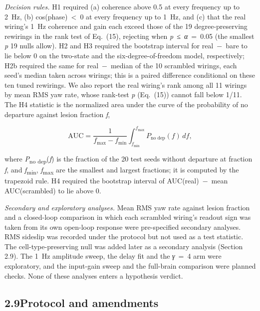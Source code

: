 \documentclass[11pt,letterpaper]{article}
\begin{document}
\emph{Decision rules.} H1 required (a) coherence above 0.5 at every
frequency up to 2~Hz, (b) cos(phase)~\textless~0 at every frequency up
to 1~Hz, and (c) that the real wiring's 1~Hz coherence and gain each
exceed those of the 19 degree-preserving rewirings in the rank test of
Eq.~(15), rejecting when \emph{p}~≤~\emph{α}~=~0.05 (the smallest
\emph{p} 19 nulls allow). H2 and H3 required the bootstrap interval for
real~−~bare to lie below 0 on the two-state and the
six-degree-of-freedom model, respectively; H2b required the same for
real~−~median of the 10 scrambled wirings, each seed's median taken
across wirings; this is a paired difference conditional on these ten
tuned rewirings. We also report the real wiring's rank among all 11
wirings by mean RMS yaw rate, whose rank-test \emph{p} (Eq.~(15)) cannot
fall below 1/11. The H4 statistic is the normalized area under the curve
of the probability of no departure against lesion fraction \emph{f},

\[\mathrm{AUC}=\frac{1}{f_{\max}-f_{\min}}\int_{f_{\min}}^{f_{\max}}P_{\text{no dep}}(f)\,df,\tag{16}\]

\noindent where \emph{P}\textsubscript{no dep}(\emph{f}) is the fraction
of the 20 test seeds without departure at fraction \emph{f}, and
\emph{f}\textsubscript{min}, \emph{f}\textsubscript{max} are the
smallest and largest fractions; it is computed by the trapezoid rule. H4
required the bootstrap interval of AUC(real)~−~mean AUC(scrambled) to
lie above 0.

\emph{Secondary and exploratory analyses.} Mean RMS yaw rate against
lesion fraction and a closed-loop comparison in which each scrambled
wiring's readout sign was taken from its own open-loop response were
pre-specified secondary analyses. RMS sideslip was recorded under the
protocol but not used as a test statistic. The cell-type-preserving null
was added later as a secondary analysis (Section 2.9). The 1~Hz
amplitude sweep, the delay fit and the \emph{γ}~=~4 arm were
exploratory, and the input-gain sweep and the full-brain comparison were
planned checks. None of these analyses enters a hypothesis verdict.

\subsection{\texorpdfstring{2.9\quad Protocol and
amendments}{2.9Protocol and amendments}}\label{protocol-and-amendments}
\end{document}
